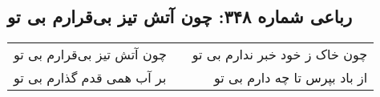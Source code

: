 \begin{center}
\section*{رباعی شماره ۳۴۸: چون آتش تیز بی‌قرارم بی تو}
\label{sec:sh348}
\begin{longtable}{l p{0.5cm} r}
چون آتش تیز بی‌قرارم بی تو
&&
چون خاک ز خود خبر ندارم بی تو
\\
بر آب همی قدم گذارم بی تو
&&
از باد بپرس تا چه دارم بی تو
\\
\end{longtable}
\end{center}
